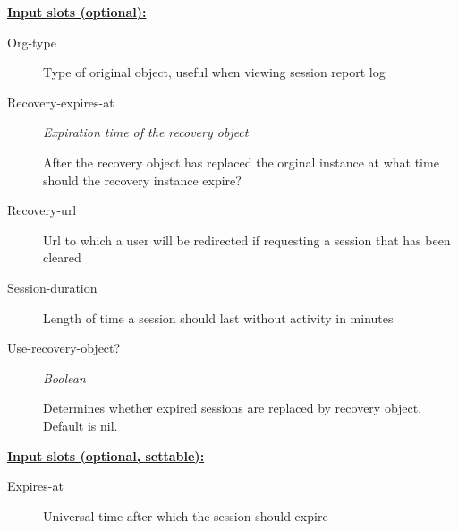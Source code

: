 \documentclass [11pt]{book}
\begin{document}
\begin{itemize}
\textbf{
\underline{Input slots (optional):}}

\begin{description}

\item [Org-type]

Type of original object, useful when viewing session report log




\item [Recovery-expires-at]
\emph{Expiration time of the recovery object}

 After the recovery object has replaced the orginal
instance at what time should the recovery instance expire?




\item [Recovery-url]

Url to which a user will be redirected if requesting a session that has been cleared




\item [Session-duration]

Length of time a session should last without activity in minutes




\item [Use-recovery-object?]
\emph{Boolean}

 Determines whether expired sessions are replaced by recovery object. Default is nil.




\end{description}






\textbf{
\underline{Input slots (optional, settable):}}

\begin{description}

\item [Expires-at]

Universal time after which the session should expire




\end{description}







\end{itemize}
\end{document}
